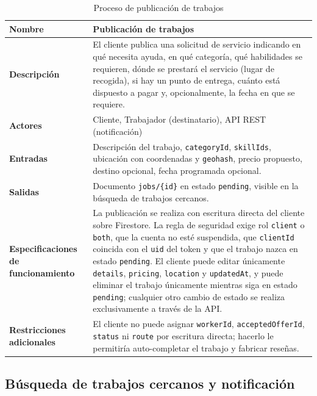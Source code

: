 \documentclass[doc,12pt,a4paper]{apa7}
\begin{document}
\begin{longtable}{|P{3.3cm}|L{11.2cm}|}
\caption{Proceso de publicación de trabajos}\\
\hline
\textbf{Nombre} & Publicación de trabajos \\ \hline
\textbf{Descripción} & El cliente publica una solicitud de servicio indicando en qué necesita ayuda, en qué categoría, qué habilidades se requieren, dónde se prestará el servicio (lugar de recogida), si hay un punto de entrega, cuánto está dispuesto a pagar y, opcionalmente, la fecha en que se requiere. \\ \hline
\textbf{Actores} & Cliente, Trabajador (destinatario), API REST (notificación) \\ \hline
\textbf{Entradas} & Descripción del trabajo, \texttt{categoryId}, \texttt{skillIds}, ubicación con coordenadas y \texttt{geohash}, precio propuesto, destino opcional, fecha programada opcional. \\ \hline
\textbf{Salidas} & Documento \texttt{jobs/\{id\}} en estado \texttt{pending}, visible en la búsqueda de trabajos cercanos. \\ \hline
\textbf{Especificaciones de funcionamiento} & La publicación se realiza con escritura directa del cliente sobre Firestore. La regla de seguridad exige rol \texttt{client} o \texttt{both}, que la cuenta no esté suspendida, que \texttt{clientId} coincida con el \texttt{uid} del token y que el trabajo nazca en estado \texttt{pending}. El cliente puede editar únicamente \texttt{details}, \texttt{pricing}, \texttt{location} y \texttt{updatedAt}, y puede eliminar el trabajo únicamente mientras siga en estado \texttt{pending}; cualquier otro cambio de estado se realiza exclusivamente a través de la API. \\ \hline
\textbf{Restricciones adicionales} & El cliente no puede asignar \texttt{workerId}, \texttt{acceptedOfferId}, \texttt{status} ni \texttt{route} por escritura directa; hacerlo le permitiría auto-completar el trabajo y fabricar reseñas. \\ \hline
\end{longtable}

\subsection{Búsqueda de trabajos cercanos y notificación}
\end{document}
